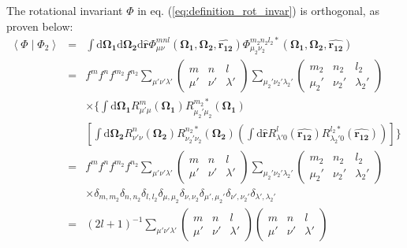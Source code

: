 The rotational invariant $\Phi$ in eq. (\ref{eq:definition_rot_invar})
is orthogonal, as proven below:
\begin{eqnarray}
\left\langle \Phi\mid\Phi_{2}\right\rangle  & = & \int\mathrm{d}\mathbf{\Omega_{1}}\mathrm{d}\mathbf{\Omega_{2}}\mathrm{d}\hat{\mathbf{r}}\Phi_{\mu\nu}^{mnl}(\mathbf{\Omega_{1}},\mathbf{\Omega_{2}},\mathbf{\hat{r_{12}}})\Phi_{\mu_{2}\nu_{2}}^{m_{2}n_{2}l_{2}*}(\mathbf{\Omega_{1}},\mathbf{\Omega_{2}},\mathbf{\hat{r_{12}}})\nonumber \\
 & = & f^{m}f^{n}f^{m_{2}}f^{n_{2}}\sum_{\mu'\nu'\lambda'}\left(\begin{array}{ccc}
m & n & l\\
\mu' & \nu' & \lambda'
\end{array}\right)\sum_{\mu_{2}'\nu_{2}'\lambda_{2}'}\left(\begin{array}{ccc}
m_{2} & n_{2} & l_{2}\\
\mu_{2}' & \nu_{2}' & \lambda_{2}'
\end{array}\right)\nonumber \\
 &  & \times\{\int\mathrm{d}\mathbf{\Omega_{1}}R_{\mu'\mu}^{m}(\mathbf{\Omega_{1}})R_{\mu_{2}'\mu_{2}}^{m_{2}*}(\mathbf{\Omega_{1}})\nonumber \\
 &  & \left[\int\mathrm{d}\mathbf{\Omega_{2}}R_{\nu'\nu}^{n}(\mathbf{\Omega_{2}})R_{\nu_{2}'\nu_{2}}^{n_{2}*}(\mathbf{\Omega_{2}})\left(\int\mathrm{d}\hat{\mathbf{r}}R_{\lambda'0}^{l}(\mathbf{\hat{r_{12}}})R_{\lambda_{2}'0}^{l_{2}*}(\mathbf{\hat{r_{12}}})\right)\right]\}\nonumber \\
 & = & f^{m}f^{n}f^{m_{2}}f^{n_{2}}\sum_{\mu'\nu'\lambda'}\left(\begin{array}{ccc}
m & n & l\\
\mu' & \nu' & \lambda'
\end{array}\right)\sum_{\mu_{2}'\nu_{2}'\lambda_{2}'}\left(\begin{array}{ccc}
m_{2} & n_{2} & l_{2}\\
\mu_{2}' & \nu_{2}' & \lambda_{2}'
\end{array}\right)\nonumber \\
 &  & \times\delta_{m,m_{2}}\delta_{n,n_{2}}\delta_{l,l_{2}}\delta_{\mu,\mu_{2}}\delta_{\nu,\nu_{2}}\delta_{\mu',\mu_{2}'}\delta_{\nu',\nu_{2}'}\delta_{\lambda',\lambda_{2}'}\nonumber \\
 & = & \left(2l+1\right)^{-1}\sum_{\mu'\nu'\lambda'}\left(\begin{array}{ccc}
m & n & l\\
\mu' & \nu' & \lambda'
\end{array}\right)\left(\begin{array}{ccc}
m & n & l\\
\mu' & \nu' & \lambda'
\end{array}\right)
\end{eqnarray}
